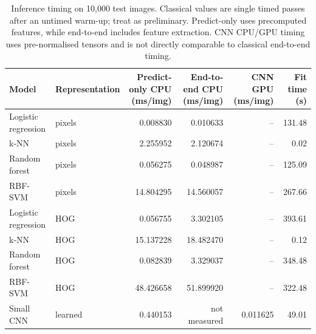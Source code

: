 \begin{table}[t]
\centering
\caption{Inference timing on 10,000 test images. Classical values are single timed passes after an untimed warm-up; treat as preliminary. Predict-only uses precomputed features, while end-to-end includes feature extraction. CNN CPU/GPU timing uses pre-normalised tensors and is not directly comparable to classical end-to-end timing.}
\label{tab:inference}
\small
\begin{tabular}{llrrrr}
\toprule
Model & Representation & Predict-only CPU (ms/img) & End-to-end CPU (ms/img) & CNN GPU (ms/img) & Fit time (s) \\
\midrule
Logistic regression & pixels & 0.008830 & 0.010633 & -- & 131.48 \\
k-NN & pixels & 2.255952 & 2.120674 & -- & 0.02 \\
Random forest & pixels & 0.056275 & 0.048987 & -- & 125.09 \\
RBF-SVM & pixels & 14.804295 & 14.560057 & -- & 267.66 \\
Logistic regression & HOG & 0.056755 & 3.302105 & -- & 393.61 \\
k-NN & HOG & 15.137228 & 18.482470 & -- & 0.12 \\
Random forest & HOG & 0.082839 & 3.329037 & -- & 348.48 \\
RBF-SVM & HOG & 48.426658 & 51.899920 & -- & 322.48 \\
Small CNN & learned & 0.440153 & not measured & 0.011625 & 49.01 \\
\bottomrule
\end{tabular}
\end{table}
